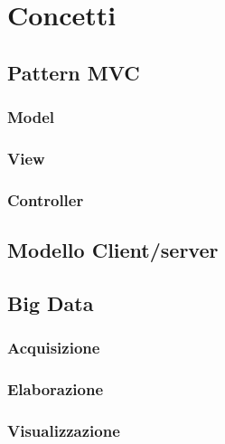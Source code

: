 \chapter{Concetti}%
	\section{Pattern MVC}
		\subsection{Model}
		\subsection{View}
		\subsection{Controller}
	\section{Modello Client/server}
	\section{Big Data}
		\subsection{Acquisizione}
		\subsection{Elaborazione}
		\subsection{Visualizzazione}